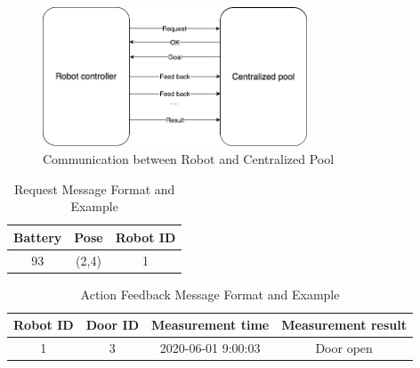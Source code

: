 \begin{figure}[htbp]
    \centering
    \includegraphics[width = 0.7\textwidth]{content/images/ch4/robot_pool_comminication.drawio.png}
    \caption{Communication between Robot and Centralized Pool}
    \label{fig:comminication}
\end{figure}

\begin{table}[htb]
\centering
\begin{tabular}{|c|c|c|} 
\hline
Battery & Pose & Robot ID\\
\hline\hline
93	&(2,4)	&1 \\ [1ex] 
\hline
\end{tabular}
\caption{Request Message Format and Example}
\label{tab:request_message}
\end{table}

\begin{table}[htb]
\centering
{}
\caption{Action Goal Message Format and Example}
\label{tab:goal_message}
\end{table}

\begin{table}[htb]
\centering
\begin{tabular}{|c|c|c|c|} 
\hline
Robot ID & Door ID & Measurement time & Measurement result \\
\hline\hline
1	& 3	& 2020-06-01 9:00:03 & Door open \\ [1ex] 
\hline
\end{tabular}
\caption{Action Feedback Message Format and Example}
\label{tab:feedback_message}
\end{table}

